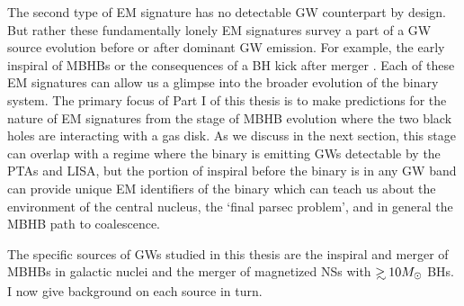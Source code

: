 The second type of EM signature has no detectable GW counterpart by design.
But rather these fundamentally lonely EM signatures survey a part of a GW
source evolution before or after dominant GW emission. For example, the early
inspiral of MBHBs \citep{Haiman+2008, HKM09} or the consequences of a BH kick
after merger \citep{BHkicks}. Each of these EM signatures can allow us a
glimpse into the broader evolution of the binary system. The primary focus of
Part I of this thesis is to make predictions for the nature of EM signatures
from the stage of MBHB evolution where the two black holes are interacting
with a gas disk. As we discuss in the next section, this stage can overlap
with a regime where the binary is emitting GWs detectable by the PTAs and
LISA, but the portion of inspiral before the binary is in any GW band
can provide unique EM identifiers of the binary which can teach us about the
environment of the central nucleus, the `final parsec problem', and in general
the MBHB path to coalescence.





 



The specific sources of GWs studied in this thesis are the inspiral and merger
of MBHBs in galactic nuclei and the merger of magnetized NSs with $\gsim 10
\Msun$ BHs. I now give background on each source in turn.

